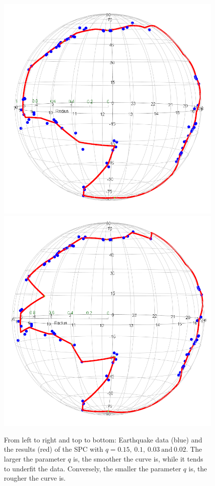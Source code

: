 \begin{figure}[h]
    \includegraphics[scale=0.25]{figures/SPC(earthquake)q=003.png}
    \hspace{0.8cm}
    \includegraphics[scale=0.24]{figures/SPC(earthquake)q=002.png}
    \vspace{0cm}
    \caption{From left to right and top to bottom: Earthquake data (blue) and the results (red) of the SPC with $q=0.15,~ 0.1,~ 0.03~ \mbox{and}~ 0.02$. The larger the parameter $q$ is, the smoother the curve is, while it tends to underfit the data. Conversely, the smaller the parameter $q$ is, the rougher the curve is.}
    \label{fig:SPC:change}
\end{figure}

